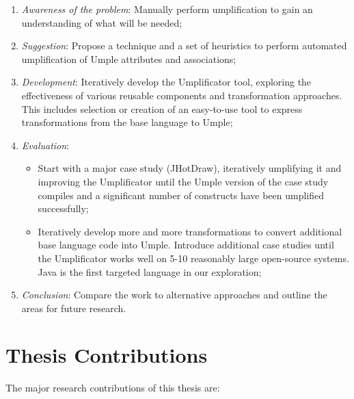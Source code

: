 \begin{enumerate}
\item \textit{Awareness of the problem}: Manually perform umplification to gain an understanding of what will be needed;

\item \textit{Suggestion}: Propose a technique and a set of heuristics to perform automated umplification of Umple attributes and associations;

\item \textit{Development}:	Iteratively develop the Umplificator tool, exploring the effectiveness of various reusable components and transformation approaches. This includes selection or creation of an easy-to-use tool to express transformations from the base language to Umple;

\item  \textit{Evaluation}: 
\begin{itemize}
\item Start with a major case study (JHotDraw), iteratively umplifying it and improving the Umplificator until the Umple version of the case study compiles and a significant number of constructs have been umplified successfully;
\item Iteratively develop more and more transformations to convert additional base language code into Umple. Introduce additional case studies until the Umplificator works well on 5-10 reasonably large open-source systems. Java is the first targeted language in our exploration; 
\end{itemize}

\item \textit{Conclusion}: Compare the work to alternative approaches and outline the areas for future research.
\end{enumerate}
\section{Thesis Contributions}

The major research contributions of this thesis are:

